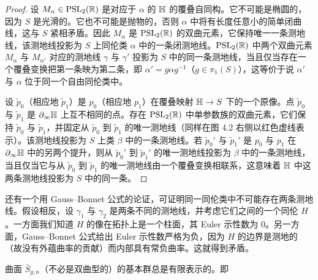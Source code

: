 \begin{proof}
设 $M_\alpha\in\operatorname{PSL}_2(\mathbb{R})$ 是对应于 $\alpha$ 的 $\mathbb{H}$ 的覆叠自同构。它不可能是椭圆的，因为 $S$ 是光滑的。它也不可能是抛物的，否则 $\alpha$ 中将有长度任意小的简单闭曲线，这与 $S$ 紧相矛盾。因此 $M_\alpha$ 是 $\operatorname{PSL}_2(\mathbb{R})$ 的双曲元素，它保持唯一一条测地线，该测地线投影为 $S$ 上同伦类 $\alpha$ 中的一条闭测地线。$\operatorname{PSL}_2(\mathbb{R})$ 中两个双曲元素 $M_\alpha$ 与 $M_{\alpha'}$ 对应的测地线 $\gamma$ 与 $\gamma'$ 投影为 $S$ 中的同一条测地线，当且仅当存在一个覆叠变换把第一条映为第二条，即 $\alpha'=g\alpha g^{-1}$（$g\in\pi_1(S)$），这等价于说 $\alpha'$ 与 $\alpha$ 位于同一个自由同伦类中。

设 $\tilde p_0$（相应地 $\tilde p_1$）是 $p_0$（相应地 $p_1$）在覆叠映射 $\mathbb{H}\to S$ 下的一个原像。点 $\tilde p_0$ 与 $\tilde p_1$ 是 $\partial_\infty\mathbb{H}$ 上互不相同的点。存在 $\operatorname{PSL}_2(\mathbb{R})$ 中单参数族的双曲元素，它们保持 $\tilde p_0$ 与 $\tilde p_1$，并固定从 $\tilde p_0$ 到 $\tilde p_1$ 的唯一测地线（同样在图 4.2 右侧以红色虚线表示）。该测地线投影为 $S$ 上类 $\beta$ 中的一条测地线。若 $\tilde p_0'$ 与 $\tilde p_1'$ 是 $p_0$ 与 $p_1$ 在 $\partial_\infty\mathbb{H}$ 中的另两个提升，则从 $\tilde p_0'$ 到 $\tilde p_1'$ 的唯一测地线投影为 $\beta$ 中的一条测地线，当且仅当它与从 $\tilde p_0$ 到 $\tilde p_1$ 的唯一测地线由一个覆叠变换相联系，这意味着 $\mathbb{H}$ 中这两条测地线投影为 $S$ 中的同一条。
\end{proof}

\begin{remark}[4.5]
还有一个用 Gauss--Bonnet 公式的论证，可证明同一同伦类中不可能存在两条测地线。假设相反，设 $\gamma_1$ 与 $\gamma_2$ 是两条不同的测地线，并考虑它们之间的一个同伦 $H$。一方面我们知道 $H$ 的像在拓扑上是一个柱面，其 Euler 示性数为 $0$。另一方面，Gauss--Bonnet 公式给出 Euler 示性数严格为负，因为 $H$ 的边界是测地的（故没有外蕴曲率的贡献）而内部具有常负曲率。这就得到矛盾。
\end{remark}


曲面 $\bar S_{g,n}$（不必是双曲型的）的基本群总是有限表示的。即

